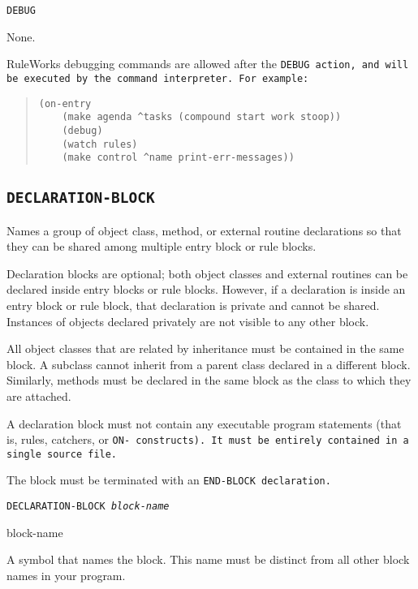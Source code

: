 \Format

\tt{DEBUG}

\Arguments

None.

\Example

RuleWorks debugging commands are allowed after the \tt{DEBUG} action,
and will be executed by the command interpreter. For example:

\begin{quote}
\begin{verbatim}
(on-entry
    (make agenda ^tasks (compound start work stoop))
    (debug)
    (watch rules)
    (make control ^name print-err-messages))
\end{verbatim}
\end{quote}

\subsection{\tt{DECLARATION-BLOCK}}

Names a group of object class, method, or external routine
declarations so that they can be shared among multiple entry block or
rule blocks.

Declaration blocks are optional; both object classes and external
routines can be declared inside entry blocks or rule blocks.  However,
if a declaration is inside an entry block or rule block, that
declaration is private and cannot be shared. Instances of objects
declared privately are not visible to any other block.

All object classes that are related by inheritance must be contained
in the same block. A subclass cannot inherit from a parent class
declared in a different block. Similarly, methods must be declared in
the same block as the class to which they are attached.

A declaration block must not contain any executable program statements
(that is, rules, catchers, or \tt{ON-} constructs). It must be
entirely contained in a single source file.

The block must be terminated with an \tt{END-BLOCK} declaration.

\Format

\tt{DECLARATION-BLOCK} \it{block-name}

\begin{arguments}
\item[block-name]

  A symbol that names the block. This name must be distinct from all
  other block names in your program.
\end{arguments}


